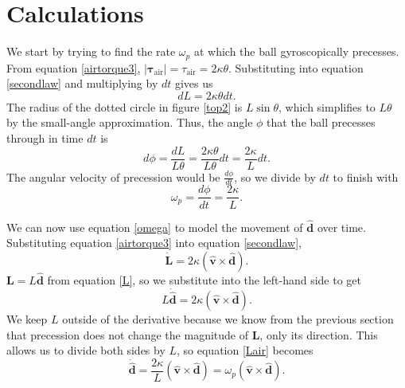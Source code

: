 \documentclass{article}
\begin{document}
\section{Calculations}
We start by trying to find the rate $\omega_p$ at which the ball gyroscopically precesses. From equation \ref{airtorque3}, $|\pmb{\tau}_{\text{air}}| = \tau_{\text{air}} = 2\kappa\theta$.
Substituting into equation \ref{secondlaw} and multiplying by $dt$ gives us
\begin{equation*}
    dL = 2\kappa\theta dt\text{.}
\end{equation*}
The radius of the dotted circle in figure \ref{top2} is $L\sin{\theta}$, which simplifies to $L\theta$ by the small-angle approximation. Thus, the angle $\phi$ that the ball precesses through in time $dt$ is
\begin{equation*}
    d\phi = \frac{dL}{L\theta} = \frac{2\kappa\theta}{L\theta}dt = \frac{2\kappa}{L}dt\text{.}
\end{equation*}
The angular velocity of precession would be $\frac{d\phi}{dt}$, so we divide by $dt$ to finish with
\begin{equation}\label{omega}
    \omega_p = \frac{d\phi}{dt} = \frac{2\kappa}{L}\text{.}
\end{equation}

We can now use equation \ref{omega} to model the movement of $\mathbf{\hat{d}}$ over time. Substituting equation \ref{airtorque3} into equation \ref{secondlaw},
\begin{equation}\label{Lair}
    \mathbf{\dot{L}} = 2\kappa(\mathbf{\hat{v}} \times \mathbf{\hat{d}})\text{.}
\end{equation}
$\mathbf{L} = L\mathbf{\hat{d}}$ from equation \ref{L}, so we substitute into the left-hand side to get
\begin{equation*}
    L\mathbf{\dot{\hat{d}}} = 2\kappa(\mathbf{\hat{v}} \times \mathbf{\hat{d}})\text{.}
\end{equation*}
We keep $L$ outside of the derivative because we know from the previous section that precession does not change the magnitude of $\mathbf{L}$, only its direction. This allows us to divide both sides by $L$, so equation \ref{Lair} becomes
\begin{equation}\label{dair}
    \mathbf{\dot{\hat{d}}} = \frac{2\kappa}{L}(\mathbf{\hat{v}} \times \mathbf{\hat{d}}) = \omega_p(\mathbf{\hat{v}} \times \mathbf{\hat{d}})\text{.}
\end{equation}
\end{document}
